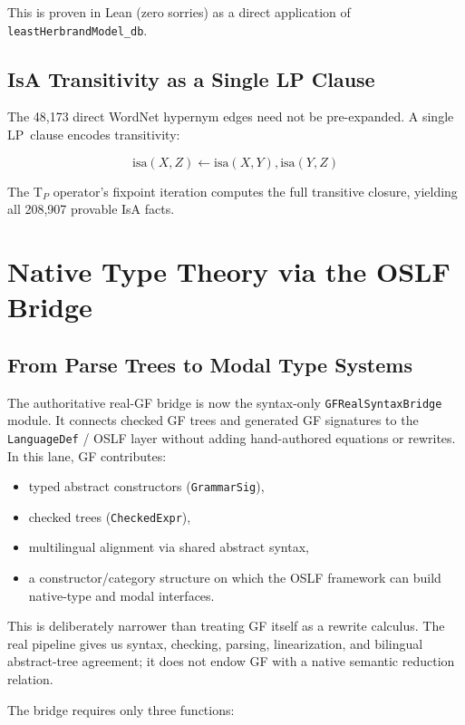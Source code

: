 \documentclass[]{article}
\newcommand{\code}[1]{\texttt{#1}}
\begin{document}
This is proven in Lean (zero sorries) as a direct application of
\code{leastHerbrandModel\_db}.

\subsection{IsA Transitivity as a Single LP Clause}

The 48,173 direct WordNet hypernym edges need not be pre-expanded.
A single LP~clause encodes transitivity:

$$\text{isa}(X, Z) \leftarrow \text{isa}(X, Y), \text{isa}(Y, Z)$$

The T$_P$ operator's fixpoint iteration computes the full transitive
closure, yielding all 208,907 provable IsA facts.

\section{Native Type Theory via the OSLF Bridge}
\label{sec:ntt}

\subsection{From Parse Trees to Modal Type Systems}

The authoritative real-GF bridge is now the syntax-only
\code{GFRealSyntaxBridge} module.  It connects checked GF trees and
generated GF signatures to the \code{LanguageDef} / OSLF layer without
adding hand-authored equations or rewrites.  In this lane, GF
contributes:
\begin{itemize}
\item typed abstract constructors (\code{GrammarSig}),
\item checked trees (\code{CheckedExpr}),
\item multilingual alignment via shared abstract syntax,
\item a constructor/category structure on which the OSLF framework can
  build native-type and modal interfaces.
\end{itemize}

This is deliberately narrower than treating GF itself as a rewrite
calculus.  The real pipeline gives us syntax, checking, parsing,
linearization, and bilingual abstract-tree agreement; it does not
endow GF with a native semantic reduction relation.

The bridge requires only three functions:
\end{document}
